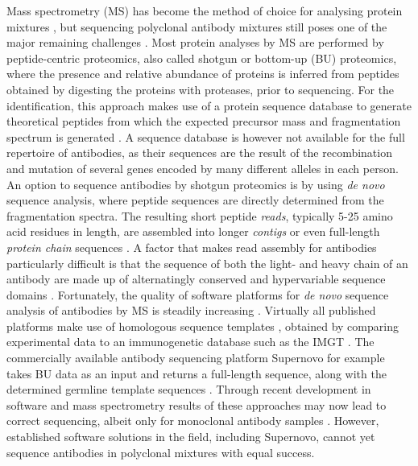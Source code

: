 Mass spectrometry (MS) has become the method of choice for analysing protein mixtures \cite{altelaar2013next-generation, aebersold2016mass-spectrometric}, but sequencing polyclonal antibody mixtures still poses one of the major remaining challenges \cite{sen2017automated, peng2021mass, srzentić2020interlaboratory}. Most protein analyses by MS are performed by peptide-centric proteomics, also called shotgun or bottom-up (BU) proteomics, where the presence and relative abundance of proteins is inferred from peptides obtained by digesting the proteins with proteases, prior to sequencing. For the identification, this approach makes use of a protein sequence database to generate theoretical peptides from which the expected precursor mass and fragmentation spectrum is generated \cite{aebersold2003mass}. A sequence database is however not available for the full repertoire of antibodies, as their sequences are the result of the recombination and mutation of several genes encoded by many different alleles in each person. An option to sequence antibodies by shotgun proteomics is by using \emph{de novo} sequence analysis, where peptide sequences are directly determined from the fragmentation spectra. The resulting short peptide \emph{reads}, typically 5-25 amino acid residues in length, are assembled into longer \emph{contigs} or even full-length \emph{protein chain} sequences \cite{sen2017automated, tran2016complete, guthals2012shotgun}. A factor that makes read assembly for antibodies particularly difficult is that the sequence of both the light- and heavy chain of an antibody are made up of alternatingly conserved and hypervariable sequence domains \cite{charlesajaneway2001generation, alberts2002generation}. Fortunately, the quality of software platforms for \emph{de novo} sequence analysis of antibodies by MS is steadily increasing \cite{graaf2022perspective}. Virtually all published platforms make use of homologous sequence templates \cite{sen2017automated, tran2016complete, schulte2022template-based, castellana2010template}, obtained by comparing experimental data to an immunogenetic database such as the IMGT \cite{lefranc2003imgt, lefranc2020immunoglobulins}. The commercially available antibody sequencing platform Supernovo for example takes BU data as an input and returns a full-length sequence, along with the determined germline template sequences \cite{sen2017automated}. Through recent development in software and mass spectrometry results of these approaches may now lead to correct sequencing, albeit only for monoclonal antibody samples \cite{peng2021mass}. However, established software solutions in the field, including Supernovo, cannot yet sequence antibodies in polyclonal mixtures with equal success.
